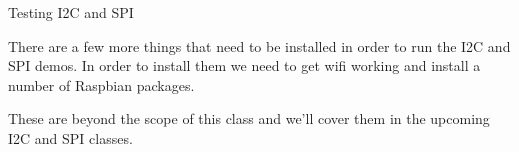 \begin{frame}
   {Testing I2C and SPI}

   There are a few more things that need to be installed in order to run
	the I2C and SPI demos. In order to install them we need to get wifi
	working and install a number of Raspbian packages.

   These are beyond the scope of this class and we'll cover them in the upcoming
	I2C and SPI classes.
\end{frame}

\cprotect\note{


}

